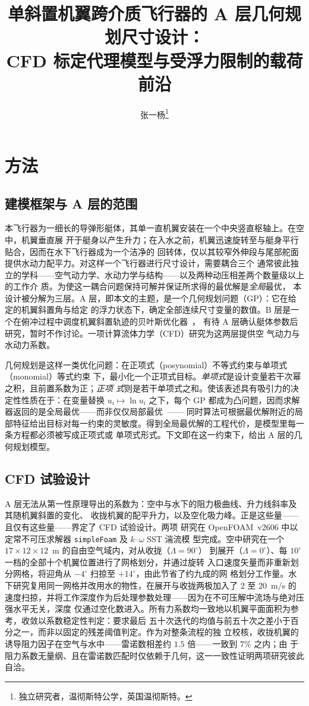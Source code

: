 \documentclass[a4paper,10pt,twocolumn]{ctexart}
\title{单斜置机翼跨介质飞行器的 A 层几何规划尺寸设计：\\CFD 标定代理模型与受浮力限制的载荷前沿}
\author{张一杨\thanks{独立研究者，温彻斯特公学，英国温彻斯特。}}
\date{}
\begin{document}
\maketitle

\section{方法}

\subsection{建模框架与 A 层的范围}
本飞行器为一细长的导弹形艇体，其单一直机翼安装在一个中央竖直枢轴上。在空中，机翼垂直展
开于艇身以产生升力；在入水之前，机翼迅速旋转至与艇身平行贴合，因而在水下飞行器成为一个洁净的
回转体，仅以其较窄外伸段与尾部舵面提供水动力配平力。对这样一个飞行器进行尺寸设计，需要耦合三个
通常彼此独立的学科——空气动力学、水动力学与结构——以及两种动压相差两个数量级以上的工作介
质。为使这一耦合问题保持可解并保证所求得的最优解是\emph{全局}最优，
本设计被分解为三层。A 层，即本文的主题，是一个几何规划问题（GP）：它在给定的机翼斜置角与给定
的浮力状态下，确定全部连续尺寸变量的数值。B 层是一个在俯冲过程中调度机翼斜置轨迹的贝叶斯优化器~\cite{long2025entire}，
有待 A 层确认艇体参数后研究，暂时不作讨论。一项计算流体力学（CFD）研究为这两层提供空
气动力与水动力系数。

几何规划是这样一类优化问题：在正项式（posynomial）不等式约束与单项式（monomial）等式约束
下，最小化一个正项式目标。\emph{单项式}是设计变量若干次幂之积，且前置系数为正；\emph{正项
式}则是若干单项式之和。使该表述具有吸引力的决定性性质在于：在变量替换 $u_i\mapsto\ln u_i$
之下，每个 GP 都成为凸问题，因而求解器返回的是全局最优——而非仅仅局部最优~\cite{boyd2007tutorial}——
同时算法可根据最优解附近的局部特征给出目标对每一约束的灵敏度。得到全局最优解的工程代价，是模型里每一条方程都必须被写成正项式或
单项式形式。下文即在这一约束下，给出 A 层的几何规划模型。

\subsection{CFD 试验设计}\label{sec:cfd}
A 层无法从第一性原理导出的系数为：空中与水下的阻力极曲线、升力线斜率及其随机翼斜置的变化、
收拢机翼的配平升力，以及空化吸力峰。正是这些量——且仅有这些量——界定了 CFD 试验设计。两项
研究在 OpenFOAM~v2606 中以定常不可压求解器 \texttt{simpleFoam} 及 $k$--$\omega$ SST 湍流模
型完成。空中研究在一个 $17\times12\times12$~m 的自由空气域内，对从收拢（$\Lambda=90^\circ$）
到展开（$\Lambda=0^\circ$）、每 $10^\circ$ 一档的全部十个机翼位置进行了网格划分，并通过旋转
入口速度矢量而非重新划分网格，将迎角从 $-4^\circ$ 扫掠至 $+14^\circ$，由此节省了约九成的网
格划分工作量。水下研究复用同一网格并改用水的物性，在展开与收拢两极加入了 $2$ 至 $20$~m/s
的速度扫掠，并将工作深度作为后处理参数处理——因为在不可压解中流场与绝对压强水平无关，深度
仅通过空化数进入。所有力系数均一致地以机翼平面面积为参考，收敛以系数稳定性判定：要求最后
五十次迭代的均值与前五十次之差小于百分之一，而非以固定的残差阈值判定。作为对整条流程的独
立校核，收拢机翼的诱导阻力因子在空气与水中——雷诺数相差约 $1.5$ 倍——一致到 $7\%$ 之内；由
于阻力系数无量纲、且在雷诺数匹配时仅依赖于几何，这一一致性证明两项研究彼此自洽。
\end{document}
